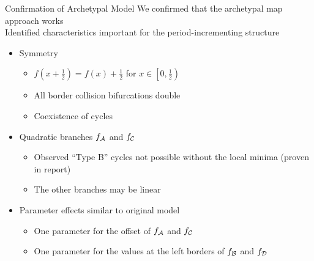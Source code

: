 \begin{frame}{Confirmation of Archetypal Model}
	\vspace{-1em}
	We confirmed that the archetypal map approach works \\
	\pause
	\vspace{1em}
	Identified characteristics important for the period-incrementing structure
	\begin{itemize}
		\item Symmetry
		      \begin{itemize}
			      \item $f\left(x + \frac{1}{2}\right) = f(x) + \frac{1}{2}$ for $x \in \left[0, \frac{1}{2}\right)$
			      \item All border collision bifurcations double
			      \item Coexistence of cycles
		      \end{itemize} \pause
		\item Quadratic branches $f_{\mathcal{A}}$ and $f_{\mathcal{C}}$
		      \begin{itemize}
			      \item Observed ``Type B'' cycles not possible without the local minima (proven in report)
			      \item The other branches may be linear
		      \end{itemize} \pause
		\item Parameter effects similar to original model
		      \begin{itemize}
			      \item One parameter for the offset of $f_{\mathcal{A}}$ and $f_{\mathcal{C}}$
			      \item One parameter for the values at the left borders of $f_{\mathcal{B}}$ and $f_{\mathcal{D}}$
		      \end{itemize}
	\end{itemize}
\end{frame}

%

